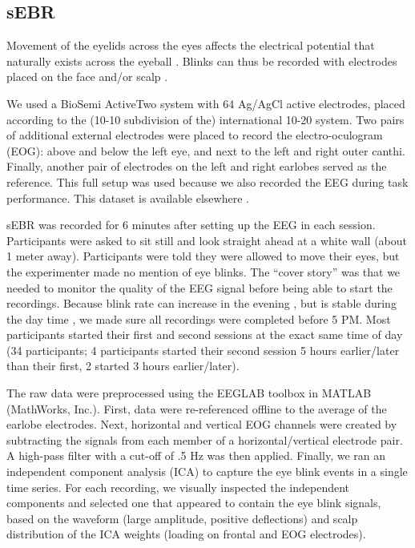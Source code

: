 \documentclass[11pt,english,]{memoir}
\begin{document}
\hypertarget{AB_sEBR-sEBR}{%
\subsection{sEBR}\label{AB_sEBR-sEBR}}

Movement of the eyelids across the eyes affects the electrical potential that naturally exists across the eyeball \autocite{Matsuo1975}. Blinks can thus be recorded with electrodes placed on the face and/or scalp \autocite{Luck2005}.

We used a BioSemi ActiveTwo system with 64 Ag/AgCl active electrodes, placed according to the (10-10 subdivision of the) international 10-20 system. Two pairs of additional external electrodes were placed to record the electro-oculogram (EOG): above and below the left eye, and next to the left and right outer canthi. Finally, another pair of electrodes on the left and right earlobes served as the reference. This full setup was used because we also recorded the EEG during task performance. This dataset is available elsewhere \autocite{Reteig2019_data}.

sEBR was recorded for 6 minutes after setting up the EEG in each session. Participants were asked to sit still and look straight ahead at a white wall (about 1 meter away). Participants were told they were allowed to move their eyes, but the experimenter made no mention of eye blinks. The ``cover story'' was that we needed to monitor the quality of the EEG signal before being able to start the recordings. Because blink rate can increase in the evening \autocite{Barbato2000}, but is stable during the day time \autocites{Barbato2000}{Doughty2006}, we made sure all recordings were completed before 5 PM. Most participants started their first and second sessions at the exact same time of day (34 participants; 4 participants started their second session 5 hours earlier/later than their first, 2 started 3 hours earlier/later).

The raw data were preprocessed using the EEGLAB toolbox \autocite{Delorme2004} in MATLAB (MathWorks, Inc.). First, data were re-referenced offline to the average of the earlobe electrodes. Next, horizontal and vertical EOG channels were created by subtracting the signals from each member of a horizontal/vertical electrode pair. A high-pass filter with a cut-off of .5 Hz was then applied. Finally, we ran an independent component analysis (ICA) to capture the eye blink events in a single time series. For each recording, we visually inspected the independent components and selected one that appeared to contain the eye blink signals, based on the waveform (large amplitude, positive deflections) and scalp distribution of the ICA weights (loading on frontal and EOG electrodes).
\end{document}
